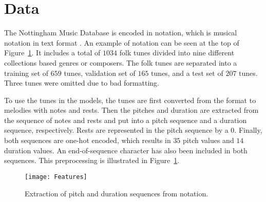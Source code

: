 \section{Data}
\label{sec:data}

The Nottingham Music Database \cite{NMD} is encoded in \ABC notation, which is musical notation in text format \cite{ABC}.
An example of \ABC notation can be seen at the top of Figure~\ref{fig:data:features}.
It includes a total of $1034$ folk tunes divided into nine different collections based genres or composers.
The folk tunes are separated into a training set of $659$ tunes, validation set of $165$ tunes, and a test set of $207$ tunes. Three tunes were omitted due to bad formatting.

To use the tunes in the models,
the tunes are first converted from the \ABC format to melodies with notes and rests.
Then the pitches and duration are extracted from the sequence of notes and rests and put into a pitch sequence and a duration sequence, respectively.
Rests are represented in the pitch sequence by a $0$.
Finally, both sequences are one-hot encoded, which results in $35$ pitch values and $14$ duration values.
An end-of-sequence character has also been included in both sequences.
This preprocessing is illustrated in Figure~\ref{fig:data:features}.

\begin{figure}
	\centering
	\texttt{[image: Features]}
	\caption{Extraction of pitch and duration sequences from \ABC notation.}
	\label{fig:data:features}
\end{figure}
